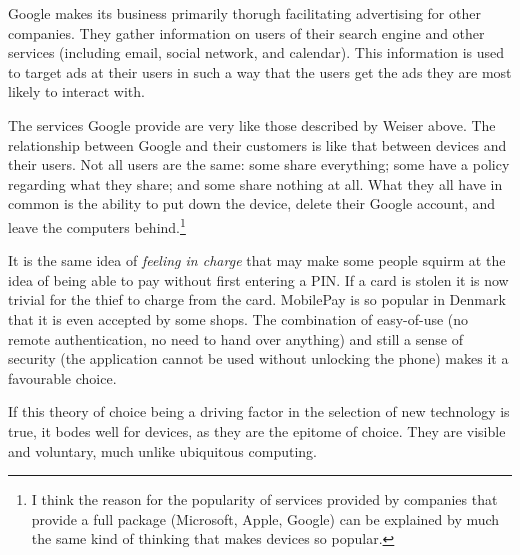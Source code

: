 Google makes its business primarily thorugh facilitating advertising for other companies. They gather information on users of
their search engine and other services (including email, social network, and calendar). This information is used to target ads
at their users in such a way that the users get the ads they are most likely to interact with.

The services Google provide are very like those described by Weiser above. The relationship between Google and their customers
is like that between devices and their users. Not all users are the same: some share everything; some have a policy regarding
what they share; and some share nothing at all. What they all have in common is the ability to put down the device, delete their
Google account, and leave the computers behind.\footnote{I think the reason for the popularity of services provided by companies
that provide a full package (Microsoft, Apple, Google) can be explained by much the same kind of thinking that makes devices so
popular.}

It is the same idea of \emph{feeling in charge} that may make some people squirm at the idea of being able to pay without first
entering a PIN. If a card is stolen it is now trivial for the thief to charge from the card. MobilePay is so popular in Denmark
that it is even accepted by some shops. The combination of easy-of-use (no remote authentication, no need to hand over anything)
and still a sense of security (the application cannot be used without unlocking the phone) makes it a favourable choice.

If this theory of choice being a driving factor in the selection of new technology is true, it bodes well for devices, as they
are the epitome of choice. They are visible and voluntary, much unlike ubiquitous computing.